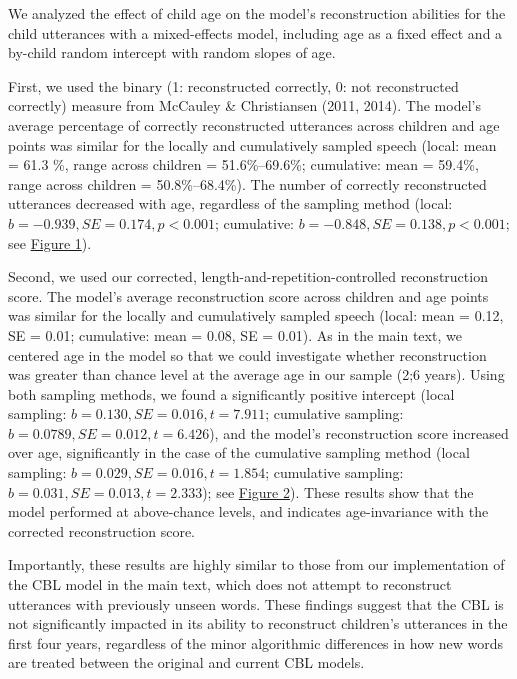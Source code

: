 \documentclass[
  english,
  man,floatsintext]{apa6}
\begin{document}
We analyzed the effect of child age on the model's reconstruction abilities for the child utterances with a mixed-effects model, including age as a fixed effect and a by-child random intercept with random slopes of age.

First, we used the binary (1: reconstructed correctly, 0: not reconstructed correctly) measure from McCauley \& Christiansen (2011, 2014). The model's average percentage of correctly reconstructed utterances across children and age points was similar for the locally and cumulatively sampled speech (local: mean = 61.3 \%, range across children = 51.6\%--69.6\%; cumulative: mean = 59.4\%, range across children = 50.8\%--68.4\%). The number of correctly reconstructed utterances decreased with age, regardless of the sampling method (local: \(b = -0.939, SE = 0.174, p < 0.001\); cumulative: \(b = -0.848, SE = 0.138, p < 0.001\); see \protect\hyperlink{smfig1}{Figure 1}).

Second, we used our corrected, length-and-repetition-controlled reconstruction score. The model's average reconstruction score across children and age points was similar for the locally and cumulatively sampled speech (local: mean = 0.12, SE = 0.01; cumulative: mean = 0.08, SE = 0.01). As in the main text, we centered age in the model so that we could investigate whether reconstruction was greater than chance level at the average age in our sample (2;6 years). Using both sampling methods, we found a significantly positive intercept (local sampling: \(b = 0.130, SE = 0.016, t = 7.911\); cumulative sampling: \(b = 0.0789, SE = 0.012, t = 6.426\)), and the model's reconstruction score increased over age, significantly in the case of the cumulative sampling method (local sampling: \(b = 0.029, SE = 0.016, t = 1.854\); cumulative sampling: \(b = 0.031, SE = 0.013, t = 2.333\)); see \protect\hyperlink{smfig2}{Figure 2}). These results show that the model performed at above-chance levels, and indicates age-invariance with the corrected reconstruction score.

Importantly, these results are highly similar to those from our implementation of the CBL model in the main text, which does not attempt to reconstruct utterances with previously unseen words. These findings suggest that the CBL is not significantly impacted in its ability to reconstruct children's utterances in the first four years, regardless of the minor algorithmic differences in how new words are treated between the original and current CBL models.
\end{document}
